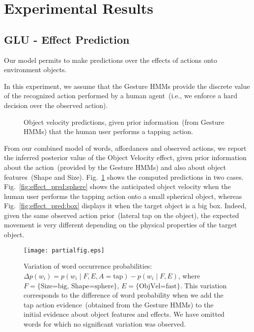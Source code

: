 
\section{Experimental Results}

\subsection{GLU - Effect Prediction}

Our model permits to make predictions over the effects of actions onto environment objects.

In this experiment, we assume that the Gesture \acp{HMM} provide the discrete value of the recognized action performed by a human agent~(i.e., we enforce a hard decision over the observed action).

\begin{figure}
    \centering
     \quad
    \caption{Object velocity predictions, given prior information~(from Gesture \acp{HMM}) that the human user performs a tapping action.}
    \label{fig:effect_pred}
\end{figure}


From our combined model of words, affordances and observed actions, we report the inferred posterior value of the Object Velocity effect, given prior information about the action~(provided by the Gesture \acp{HMM}) and also about object features~(Shape and Size). Fig.~\ref{fig:effect_pred} shows the computed predictions in two cases. Fig.~\ref{fig:effect_pred:sphere} shows the anticipated object velocity when the human user performs the tapping action onto a small spherical object, whereas Fig.~\ref{fig:effect_pred:box} displays it when the target object is a big box. Indeed, given the same observed action prior~(lateral tap on the object), the expected movement is very different depending on the physical properties of the target object.

\begin{figure}
\centering
\texttt{[image: partialfig.eps]}
\caption{Variation of word occurrence probabilities: $\Delta p(w_i) = p(w_i \mid F, E, A=\text{tap}) - p(w_i \mid F,E)$, where $F = \{\text{Size=big, Shape=sphere}\}$, $E = \{\text{ObjVel=fast}\}$. This variation corresponds to the difference of word probability when we add the tap action evidence~(obtained from the Gesture \acp{HMM}) to the initial evidence about object features and effects. We have omitted words for which no significant variation was observed.}
\label{fig:probdiff}
\end{figure}


